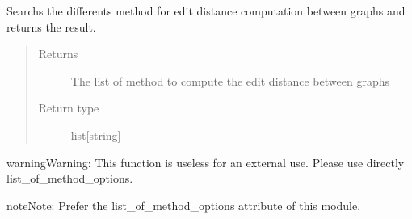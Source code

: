 \documentclass[letterpaper,10pt,english]{sphinxmanual}
\begin{document}
\begin{fulllineitems}
\label{doc:gedlibpy.get_method_options}
Searchs the differents method for edit distance computation between graphs and returns the result.
\begin{quote}\begin{description}
\item[{Returns}] \leavevmode
The list of method to compute the edit distance between graphs

\item[{Return type}] \leavevmode
list{[}string{]}

\end{description}\end{quote}

\begin{notice}{warning}{Warning:}
This function is useless for an external use. Please use directly list\_of\_method\_options.
\end{notice}

\begin{notice}{note}{Note:}
Prefer the list\_of\_method\_options attribute of this module.
\end{notice}

\end{fulllineitems}

\end{document}
